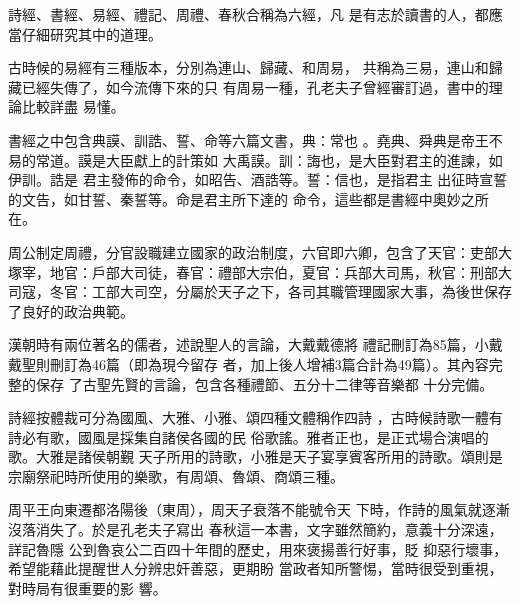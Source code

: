 \documentclass[avery5371,grid]{flashcards}
\begin{document}
{詩經、書經、易經、禮記、周禮、春秋合稱為六經，凡
是有志於讀書的人，都應當仔細研究其中的道理。} %
{} %

{古時候的易經有三種版本，分別為連山、歸藏、和周易，
共稱為三易，連山和歸藏已經失傳了，如今流傳下來的只
有周易一種，孔老夫子曾經審訂過，書中的理論比較詳盡
易懂。} %
{} %






{書經之中包含典謨、訓誥、誓、命等六篇文書，典：常也
。堯典、舜典是帝王不易的常道。謨是大臣獻上的計策如
大禹謨。訓：誨也，是大臣對君主的進諫，如伊訓。誥是
君主發佈的命令，如昭告、酒誥等。誓：信也，是指君主
出征時宣誓的文告，如甘誓、秦誓等。命是君主所下達的
命令，這些都是書經中奧妙之所在。} %
{} %

{周公制定周禮，分官設職建立國家的政治制度，六官即六卿，包含了天官：吏部大塚宰，地官：戶部大司徒，春官：禮部大宗伯，夏官：兵部大司馬，秋官：刑部大司寇，冬官：工部大司空，分屬於天子之下，各司其職管理國家大事，為後世保存了良好的政治典範。} %
{} %

{漢朝時有兩位著名的儒者，述說聖人的言論，大戴戴德將
禮記刪訂為85篇，小戴戴聖則刪訂為46篇（即為現今留存
者，加上後人增補3篇合計為49篇）。其內容完整的保存
了古聖先賢的言論，包含各種禮節、五分十二律等音樂都
十分完備。} %
{} %

{詩經按體裁可分為國風、大雅、小雅、頌四種文體稱作四詩
，古時候詩歌一體有詩必有歌，國風是採集自諸侯各國的民
俗歌謠。雅者正也，是正式場合演唱的歌。大雅是諸侯朝覲
天子所用的詩歌，小雅是天子宴享賓客所用的詩歌。頌則是
宗廟祭祀時所使用的樂歌，有周頌、魯頌、商頌三種。} %
{} %

{周平王向東遷都洛陽後（東周），周天子衰落不能號令天
下時，作詩的風氣就逐漸沒落消失了。於是孔老夫子寫出
春秋這一本書，文字雖然簡約，意義十分深遠，詳記魯隱
公到魯哀公二百四十年間的歷史，用來褒揚善行好事，貶
抑惡行壞事，希望能藉此提醒世人分辨忠奸善惡，更期盼
當政者知所警惕，當時很受到重視，對時局有很重要的影
響。} %
{} %
\end{document}
